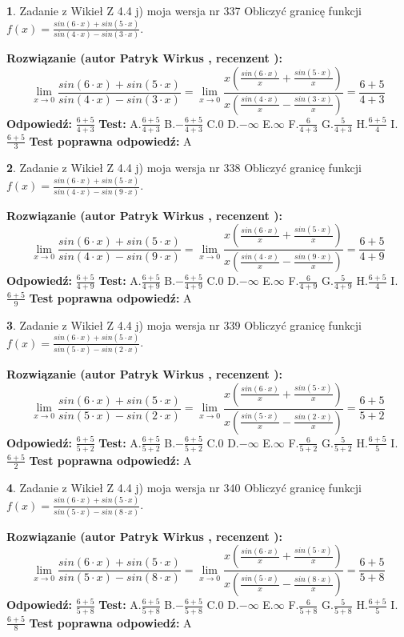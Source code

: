 \documentclass[12pt, a4paper]{article}
\theoremstyle{definition} %
\newtheorem{zad}{}
\newcommand{\zadStart}[1]{\begin{zad}#1\newline}
\newcommand{\zadStop}{\end{zad}}
\newcommand{\rozwStart}[2]{\noindent \textbf{Rozwiązanie (autor #1 , recenzent #2): }\newline}
\newcommand{\rozwStop}{\newline}
\newcommand{\odpStart}{\noindent \textbf{Odpowiedź:}\newline}
\newcommand{\odpStop}{\newline}
\newcommand{\testStart}{\noindent \textbf{Test:}\newline}
\newcommand{\testStop}{\newline}
\newcommand{\kluczStart}{\noindent \textbf{Test poprawna odpowiedź:}\newline}
\newcommand{\kluczStop}{\newline}
\begin{document}
\zadStart{Zadanie z Wikieł Z 4.4 j) moja wersja nr 337}
Obliczyć granicę funkcji $f(x)=\frac{sin(6\cdot x) +sin(5\cdot x)}{sin(4\cdot x) -sin(3\cdot x)}$.
\zadStop
\rozwStart{Patryk Wirkus}{}
$$\lim\limits_{x\to 0}\frac{sin(6\cdot x) +sin(5\cdot x)}{sin(4\cdot x) -sin(3\cdot x)}=\lim\limits_{x\to 0}\frac{x(\frac{sin(6\cdot x)}{x}+\frac{sin(5\cdot x)}{x})}{x(\frac{sin(4\cdot x)}{x}-\frac{sin(3\cdot x)}{x})}=\frac{6+5}{4+3}$$
\rozwStop
\odpStart
$\frac{6+5}{4+3}$
\odpStop
\testStart
A.$\frac{6+5}{4+3}$
B.$-\frac{6+5}{4+3}$
C.$0$
D.$-\infty$
E.$\infty$
F.$\frac{6}{4+3}$
G.$\frac{5}{4+3}$
H.$\frac{6+5}{4}$
I.$\frac{6+5}{3}$
\testStop
\kluczStart
A
\kluczStop



\zadStart{Zadanie z Wikieł Z 4.4 j) moja wersja nr 338}
Obliczyć granicę funkcji $f(x)=\frac{sin(6\cdot x) +sin(5\cdot x)}{sin(4\cdot x) -sin(9\cdot x)}$.
\zadStop
\rozwStart{Patryk Wirkus}{}
$$\lim\limits_{x\to 0}\frac{sin(6\cdot x) +sin(5\cdot x)}{sin(4\cdot x) -sin(9\cdot x)}=\lim\limits_{x\to 0}\frac{x(\frac{sin(6\cdot x)}{x}+\frac{sin(5\cdot x)}{x})}{x(\frac{sin(4\cdot x)}{x}-\frac{sin(9\cdot x)}{x})}=\frac{6+5}{4+9}$$
\rozwStop
\odpStart
$\frac{6+5}{4+9}$
\odpStop
\testStart
A.$\frac{6+5}{4+9}$
B.$-\frac{6+5}{4+9}$
C.$0$
D.$-\infty$
E.$\infty$
F.$\frac{6}{4+9}$
G.$\frac{5}{4+9}$
H.$\frac{6+5}{4}$
I.$\frac{6+5}{9}$
\testStop
\kluczStart
A
\kluczStop



\zadStart{Zadanie z Wikieł Z 4.4 j) moja wersja nr 339}
Obliczyć granicę funkcji $f(x)=\frac{sin(6\cdot x) +sin(5\cdot x)}{sin(5\cdot x) -sin(2\cdot x)}$.
\zadStop
\rozwStart{Patryk Wirkus}{}
$$\lim\limits_{x\to 0}\frac{sin(6\cdot x) +sin(5\cdot x)}{sin(5\cdot x) -sin(2\cdot x)}=\lim\limits_{x\to 0}\frac{x(\frac{sin(6\cdot x)}{x}+\frac{sin(5\cdot x)}{x})}{x(\frac{sin(5\cdot x)}{x}-\frac{sin(2\cdot x)}{x})}=\frac{6+5}{5+2}$$
\rozwStop
\odpStart
$\frac{6+5}{5+2}$
\odpStop
\testStart
A.$\frac{6+5}{5+2}$
B.$-\frac{6+5}{5+2}$
C.$0$
D.$-\infty$
E.$\infty$
F.$\frac{6}{5+2}$
G.$\frac{5}{5+2}$
H.$\frac{6+5}{5}$
I.$\frac{6+5}{2}$
\testStop
\kluczStart
A
\kluczStop



\zadStart{Zadanie z Wikieł Z 4.4 j) moja wersja nr 340}
Obliczyć granicę funkcji $f(x)=\frac{sin(6\cdot x) +sin(5\cdot x)}{sin(5\cdot x) -sin(8\cdot x)}$.
\zadStop
\rozwStart{Patryk Wirkus}{}
$$\lim\limits_{x\to 0}\frac{sin(6\cdot x) +sin(5\cdot x)}{sin(5\cdot x) -sin(8\cdot x)}=\lim\limits_{x\to 0}\frac{x(\frac{sin(6\cdot x)}{x}+\frac{sin(5\cdot x)}{x})}{x(\frac{sin(5\cdot x)}{x}-\frac{sin(8\cdot x)}{x})}=\frac{6+5}{5+8}$$
\rozwStop
\odpStart
$\frac{6+5}{5+8}$
\odpStop
\testStart
A.$\frac{6+5}{5+8}$
B.$-\frac{6+5}{5+8}$
C.$0$
D.$-\infty$
E.$\infty$
F.$\frac{6}{5+8}$
G.$\frac{5}{5+8}$
H.$\frac{6+5}{5}$
I.$\frac{6+5}{8}$
\testStop
\kluczStart
A
\kluczStop
\end{document}
